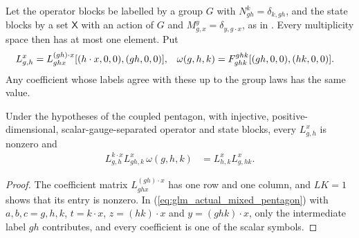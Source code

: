 \begin{definition}
    \leanok
    \label{def:glm_group_scalar_symbols}
    Let the operator blocks be labelled by a group $G$ with
    $N_{gh}^{k}=\delta_{k,gh}$, and the state blocks by a set $\mathsf X$
    with an action of $G$ and $M_{g,x}^{y}=\delta_{y,g\cdot x}$, as in
    \cite[Section~4]{GarreRubio2023MPOSym}. Every multiplicity space then
    has at most one element. Put
    \begin{align}
        L^{x}_{g,h}   & =L_{ghx}^{(gh)\cdot x}[(h\cdot x,0,0),(gh,0,0)], &
        \omega(g,h,k) & =F_{ghk}^{ghk}[(gh,0,0),(hk,0,0)].
        \notag
    \end{align}
    Any coefficient whose labels agree with these up to the group laws has
    the same value.
\end{definition}

\begin{lemma}
    \leanok
    \label{lem:glm_group_coupled_pentagon}
    Under the hypotheses of the coupled pentagon, with injective,
    positive-dimensional, scalar-gauge-separated operator and state blocks,
    every $L^x_{g,h}$ is nonzero and
    \begin{align}
        L^{k\cdot x}_{g,h}L^{x}_{gh,k}\,\omega(g,h,k)
         & =L^{x}_{h,k}L^{x}_{g,hk}.
        \label{eq:glm_group_coupled_pentagon}
    \end{align}
\end{lemma}
\begin{proof}
    \leanok
    The coefficient matrix $L_{ghx}^{(gh)\cdot x}$ has one row and one
    column, and $LK=1$ shows that its entry is nonzero. In
    (\ref{eq:glm_actual_mixed_pentagon}) with $a,b,c=g,h,k$, $t=k\cdot x$,
    $z=(hk)\cdot x$ and $y=(ghk)\cdot x$, only the intermediate label $gh$
    contributes, and every coefficient is one of the scalar symbols.
\end{proof}

